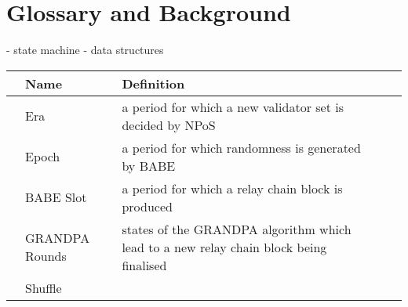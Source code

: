 \section{Glossary and Background}

- state machine
- data structures

\begin{table}[h]
\begin{tabular}{lllll}
& \textbf{Name}  & \textbf{Definition} \\
\hline
& Era  & a period for which a new validator set is decided by NPoS \\
& Epoch & a period for which randomness is generated by BABE\\
& BABE Slot & a period for which a relay chain block is produced \\
& GRANDPA Rounds & states of the GRANDPA algorithm which lead to a new relay chain block being finalised  \\
& Shuffle &  \\
\end{tabular}
\end{table}
